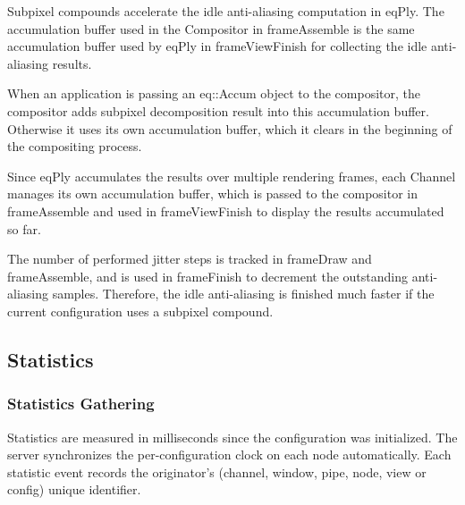 \documentclass[10pt,a4]{scrartcl}
\begin{document}
Subpixel compounds accelerate the idle anti-aliasing computation in eqPly. The
accumulation buffer used in the \textsf{Compositor} in \textsf{frameAssemble} is
the same accumulation buffer used by eqPly in \textsf{frameViewFinish} for
collecting the idle anti-aliasing results.

When an application is passing an \textsf{eq::Accum} object to the compositor,
the compositor adds subpixel decomposition result into this accumulation
buffer. Otherwise it uses its own accumulation buffer, which it clears in the
beginning of the compositing process.

Since \textsf{eqPly} accumulates the results over multiple rendering frames,
each \textsf{Channel} manages its own accumulation buffer, which is passed to
the compositor in \textsf{frameAssemble} and used in \textsf{frameViewFinish} to
display the results accumulated so far.

The number of performed jitter steps is tracked in \textsf{frameDraw} and
\textsf{frameAssemble}, and is used in \textsf{frameFinish} to decrement the
outstanding anti-aliasing samples. Therefore, the idle anti-aliasing is finished
much faster if the current configuration uses a subpixel compound.

\subsection{\label{sStatistics}Statistics}

\subsubsection{Statistics Gathering}

Statistics are measured in milliseconds since the configuration was
initialized. The server synchronizes the per-configuration clock on each node
automatically. Each statistic event records the originator's (channel, window,
pipe, node, view or config) unique identifier.
\end{document}
